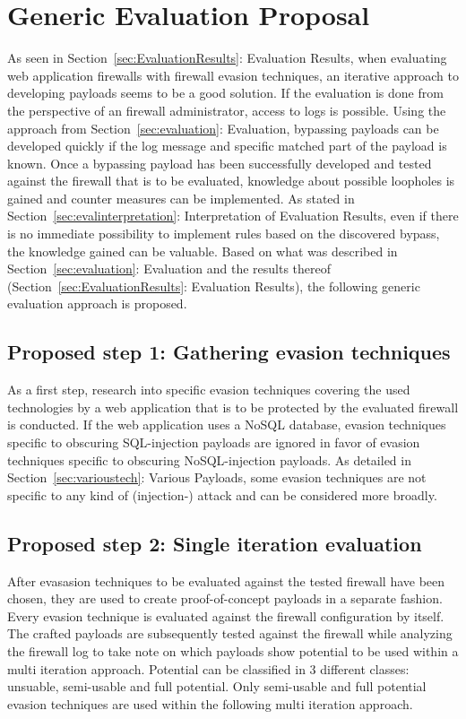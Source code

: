 \section{Generic Evaluation Proposal}
\label{sec:proposal}
As seen in Section~\ref{sec:EvaluationResults}: Evaluation Results, when evaluating web application firewalls with firewall evasion techniques, an iterative approach to developing payloads seems to be a good solution. If the evaluation is done from the perspective of an firewall administrator, access to logs is possible. Using the approach from Section~\ref{sec:evaluation}: Evaluation, bypassing payloads can be developed quickly if the log message and specific matched part of the payload is known. Once a bypassing payload has been successfully developed and tested against the firewall that is to be evaluated, knowledge about possible loopholes is gained and counter measures can be implemented. As stated in Section~\ref{sec:evalinterpretation}: Interpretation of Evaluation Results, even if there is no immediate possibility to implement rules based on the discovered bypass, the knowledge gained can be valuable. Based on what was described in Section~\ref{sec:evaluation}: Evaluation and the results thereof (Section~\ref{sec:EvaluationResults}: Evaluation Results), the following generic evaluation approach is proposed.

\subsection{Proposed step 1: Gathering evasion techniques}
As a first step, research into specific evasion techniques covering the used technologies by a web application that is to be protected by the evaluated firewall is conducted. If the web application uses a NoSQL database, evasion techniques specific to obscuring SQL-injection payloads are ignored in favor of evasion techniques specific to obscuring NoSQL-injection payloads. As detailed in Section~\ref{sec:varioustech}: Various Payloads, some evasion techniques are not specific to any kind of (injection-) attack and can be considered more broadly.

\subsection{Proposed step 2: Single iteration evaluation}
After evasasion techniques to be evaluated against the tested firewall have been chosen, they are used to create proof-of-concept payloads in a separate fashion. Every evasion technique is evaluated against the firewall configuration by itself. The crafted payloads are subsequently tested against the firewall while analyzing the firewall log to take note on which payloads show potential to be used within a multi iteration approach. Potential can be classified in 3 different classes: unsuable, semi-usable and full potential. Only semi-usable and full potential evasion techniques are used within the following multi iteration approach.

